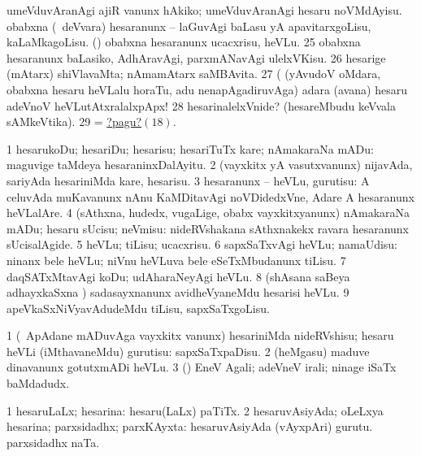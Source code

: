   
\banum
{} umeVduvAranAgi ajiR \mo vanunx hAkiko; umeVduvAranAgi hesaru noVMdAyisu. 
\eanum
\numie
{}  
\banum
{} obabxna (\kanmu\ deVvara) hesaranunx -- laGuvAgi baLasu yA apavitarxgoLisu, kaLaMkagoLisu. 
 (\hA) obabxna hesaranunx ucacxrisu, heVLu. 
\eanum
\numie
\num{25}  obabxna hesaranunx baLasiko, AdhAravAgi, parxmANavAgi ulelxVKisu. 
\num{26}  hesarige (mAtarx) shiVlavaMta; nAmamAtarx saMBAvita. 
\num{27}  (  (yAvudoV oMdara, obabxna hesaru heVLalu horaTu, adu nenapAgadiruvAga)  adara (avana) hesaru adeVnoV heVLutAtxralalxpApx! 
\num{28}  hesarinalelxVnide? (hesareMbudu keVvala sAMkeVtika). 
\num{29}  = \hyperlink{name1pagu18}{?pagu?\((18)\)}. 
\enum
\emng
\eentry

\bentry
{}
\gl{\sakirx}
\bmng
\bnum
\num{1} hesarukoDu; hesariDu; hesarisu; hesariTuTx kare; nAmakaraNa mADu:  maguvige taMdeya hesaraninxDalAyitu. 
\num{2} (vayxkitx yA vasutxvanunx) nijavAda, sariyAda hesariniMda kare, hesarisu. 
\num{3} hesaranunx -- heVLu, gurutisu:  A celuvAda muKavanunx nAnu KaMDitavAgi noVDidedxVne, Adare A hesaranunx heVLalAre. 
\num{4} (sAthxna, hudedx, \mo vugaLige, obabx vayxkitxyanunx) nAmakaraNa mADu; hesaru sUcisu; neVmisu:  nideRVshakana sAthxnakekx ravara hesaranunx sUcisalAgide. 
\num{5} heVLu; tiLisu; ucacxrisu. 
\num{6} sapxSaTxvAgi heVLu; namaUdisu:  ninanx bele heVLu; niVnu heVLuva bele eSeTxMbudanunx tiLisu. 
\num{7} daqSATxMtavAgi koDu; udAharaNeyAgi heVLu. 
\num{8} (shAsana saBeya adhayxkaSxna \vi) sadasayxnanunx avidheVyaneMdu hesarisi heVLu. 
\num{9} apeVkaSxNiVyavAdudeMdu tiLisu, sapxSaTxgoLisu. 
\enum
\emng

\noindent
\gl{\pagu}
\bmng
\bnum
\num{1}  (\kanmu\ ApAdane mADuvAga vayxkitx \mo vanunx) hesariniMda nideRVshisu; hesaru heVLi (iMthavaneMdu) gurutisu: sapxSaTxpaDisu. 
\num{2}  (heMgasu) maduve dinavanunx gotutxmADi heVLu. 
\num{3}  (\AmA) EneV Agali; adeVneV irali; ninage iSaTx baMdadudx. 
\enum
\emng
\eentry

\bentry
{}
\gl{\gu}
\bmng
\bnum
\num{1} hesaruLaLx; hesarina:  hesaru(LaLx) paTiTx. 
\num{2} hesaruvAsiyAda; oLeLxya hesarina; parxsidadhx; parxKAyxta:  hesaruvAsiyAda (vAyxpAri) gurutu.  parxsidadhx naTa. 
\enum
\emng
\eentry

